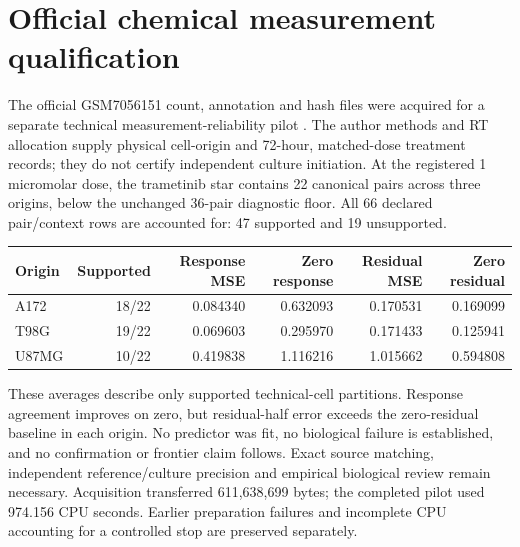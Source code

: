 \section{Official chemical measurement qualification}
The official GSM7056151 count, annotation and hash files were acquired for a separate technical measurement-reliability pilot \citep{mcfaline2024gxe}. The author methods and RT allocation supply physical cell-origin and 72-hour, matched-dose treatment records; they do not certify independent culture initiation. At the registered 1 micromolar dose, the trametinib star contains 22 canonical pairs across three origins, below the unchanged 36-pair diagnostic floor. All 66 declared pair/context rows are accounted for: 47 supported and 19 unsupported.
\begin{center}
\begin{tabular}{lrrrrr}
\toprule
Origin & Supported & Response MSE & Zero response & Residual MSE & Zero residual \\
\midrule
A172 & 18/22 & 0.084340 & 0.632093 & 0.170531 & 0.169099 \\
T98G & 19/22 & 0.069603 & 0.295970 & 0.171433 & 0.125941 \\
U87MG & 10/22 & 0.419838 & 1.116216 & 1.015662 & 0.594808 \\
\bottomrule
\end{tabular}
\end{center}
These averages describe only supported technical-cell partitions. Response agreement improves on zero, but residual-half error exceeds the zero-residual baseline in each origin. No predictor was fit, no biological failure is established, and no confirmation or frontier claim follows. Exact source matching, independent reference/culture precision and empirical biological review remain necessary. Acquisition transferred 611,638,699 bytes; the completed pilot used 974.156 CPU seconds. Earlier preparation failures and incomplete CPU accounting for a controlled stop are preserved separately.
